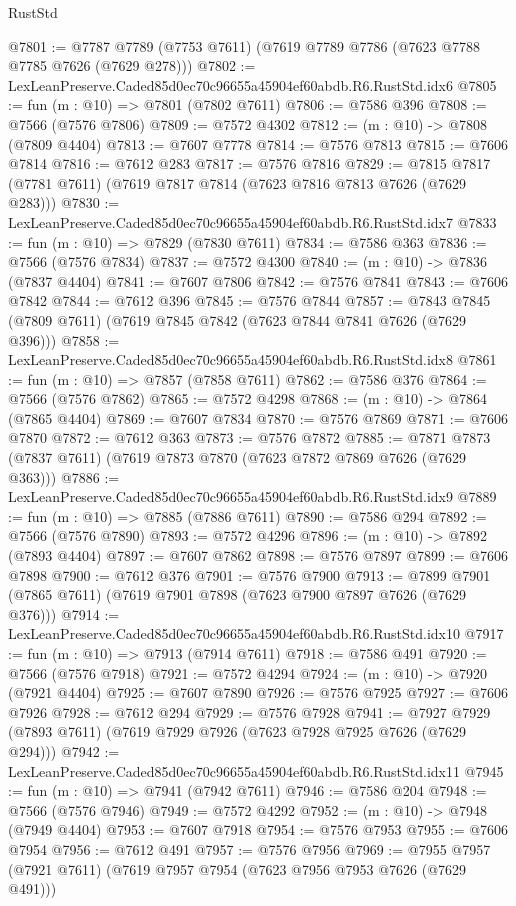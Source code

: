 \begin{lexlean}{RustStd}
\begin{coremodule}
@7801 := @7787 @7789 (@7753 @7611) (@7619 @7789 @7786 (@7623 @7788 @7785 @7626 (@7629 @278)))
@7802 := LexLeanPreserve.Caded85d0ec70c96655a45904ef60abdb.R6.RustStd.idx6
@7805 := fun (m : @10) => @7801 (@7802 @7611)
@7806 := @7586 @396
@7808 := @7566 (@7576 @7806)
@7809 := @7572 @4302
@7812 := (m : @10) -> @7808 (@7809 @4404)
@7813 := @7607 @7778
@7814 := @7576 @7813
@7815 := @7606 @7814
@7816 := @7612 @283
@7817 := @7576 @7816
@7829 := @7815 @7817 (@7781 @7611) (@7619 @7817 @7814 (@7623 @7816 @7813 @7626 (@7629 @283)))
@7830 := LexLeanPreserve.Caded85d0ec70c96655a45904ef60abdb.R6.RustStd.idx7
@7833 := fun (m : @10) => @7829 (@7830 @7611)
@7834 := @7586 @363
@7836 := @7566 (@7576 @7834)
@7837 := @7572 @4300
@7840 := (m : @10) -> @7836 (@7837 @4404)
@7841 := @7607 @7806
@7842 := @7576 @7841
@7843 := @7606 @7842
@7844 := @7612 @396
@7845 := @7576 @7844
@7857 := @7843 @7845 (@7809 @7611) (@7619 @7845 @7842 (@7623 @7844 @7841 @7626 (@7629 @396)))
@7858 := LexLeanPreserve.Caded85d0ec70c96655a45904ef60abdb.R6.RustStd.idx8
@7861 := fun (m : @10) => @7857 (@7858 @7611)
@7862 := @7586 @376
@7864 := @7566 (@7576 @7862)
@7865 := @7572 @4298
@7868 := (m : @10) -> @7864 (@7865 @4404)
@7869 := @7607 @7834
@7870 := @7576 @7869
@7871 := @7606 @7870
@7872 := @7612 @363
@7873 := @7576 @7872
@7885 := @7871 @7873 (@7837 @7611) (@7619 @7873 @7870 (@7623 @7872 @7869 @7626 (@7629 @363)))
@7886 := LexLeanPreserve.Caded85d0ec70c96655a45904ef60abdb.R6.RustStd.idx9
@7889 := fun (m : @10) => @7885 (@7886 @7611)
@7890 := @7586 @294
@7892 := @7566 (@7576 @7890)
@7893 := @7572 @4296
@7896 := (m : @10) -> @7892 (@7893 @4404)
@7897 := @7607 @7862
@7898 := @7576 @7897
@7899 := @7606 @7898
@7900 := @7612 @376
@7901 := @7576 @7900
@7913 := @7899 @7901 (@7865 @7611) (@7619 @7901 @7898 (@7623 @7900 @7897 @7626 (@7629 @376)))
@7914 := LexLeanPreserve.Caded85d0ec70c96655a45904ef60abdb.R6.RustStd.idx10
@7917 := fun (m : @10) => @7913 (@7914 @7611)
@7918 := @7586 @491
@7920 := @7566 (@7576 @7918)
@7921 := @7572 @4294
@7924 := (m : @10) -> @7920 (@7921 @4404)
@7925 := @7607 @7890
@7926 := @7576 @7925
@7927 := @7606 @7926
@7928 := @7612 @294
@7929 := @7576 @7928
@7941 := @7927 @7929 (@7893 @7611) (@7619 @7929 @7926 (@7623 @7928 @7925 @7626 (@7629 @294)))
@7942 := LexLeanPreserve.Caded85d0ec70c96655a45904ef60abdb.R6.RustStd.idx11
@7945 := fun (m : @10) => @7941 (@7942 @7611)
@7946 := @7586 @204
@7948 := @7566 (@7576 @7946)
@7949 := @7572 @4292
@7952 := (m : @10) -> @7948 (@7949 @4404)
@7953 := @7607 @7918
@7954 := @7576 @7953
@7955 := @7606 @7954
@7956 := @7612 @491
@7957 := @7576 @7956
@7969 := @7955 @7957 (@7921 @7611) (@7619 @7957 @7954 (@7623 @7956 @7953 @7626 (@7629 @491)))

\end{coremodule}
\end{lexlean}
